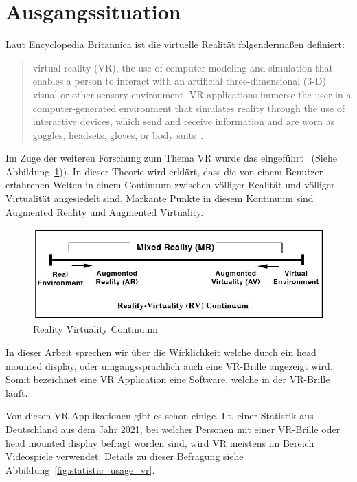 \section{Ausgangssituation}\label{sec: initial_situation}

Laut Encyclopedia Britannica ist die virtuelle Realität folgendermaßen definiert:
\begin{quotation}
    virtual reality (VR), the use of computer modeling and simulation that enables a person to interact with an artificial three-dimensional (3-D) visual or other sensory environment.
    VR applications immerse the user in a computer-generated environment that simulates reality through the use of interactive devices, which send and receive information and are worn as goggles, headsets, gloves, or body suits~\cite{LOWOOD_2021}.
\end{quotation}

Im Zuge der weiteren Forschung zum Thema VR wurde das eingeführt~\cite{MILGRAM_1994} (Siehe Abbildung~\ref{fig:reality_virtuality_continuum})).
In dieser Theorie wird erklärt, dass die von einem Benutzer erfahrenen Welten in einem Continuum zwischen völliger Realität und völliger Virtualität angesiedelt sind.
Markante Punkte in diesem Kontinuum sind Augmented Reality und Augmented Virtuality.

\begin{figure}
    \centering
    \includegraphics[scale=0.5]{pics/reality_virtuality_continuum}
    \caption{Reality Virtuality Continuum}
    \label{fig:reality_virtuality_continuum}
\end{figure}

In dieser Arbeit sprechen wir über die Wirklichkeit welche durch ein head mounted display, oder umgangssprachlich auch eine VR-Brille angezeigt wird.
Somit bezeichnet eine VR Application eine Software, welche in der VR-Brille läuft.

Von diesen VR Applikationen gibt es schon einige.
Lt. einer Statistik aus Deutschland aus dem Jahr 2021, bei welcher Personen mit einer VR-Brille oder head mounted display befragt worden sind, wird VR meistens im Bereich Videospiele verwendet.
Details zu dieser Befragung siehe Abbildung~\ref{fig:statistic_usage_vr}.


